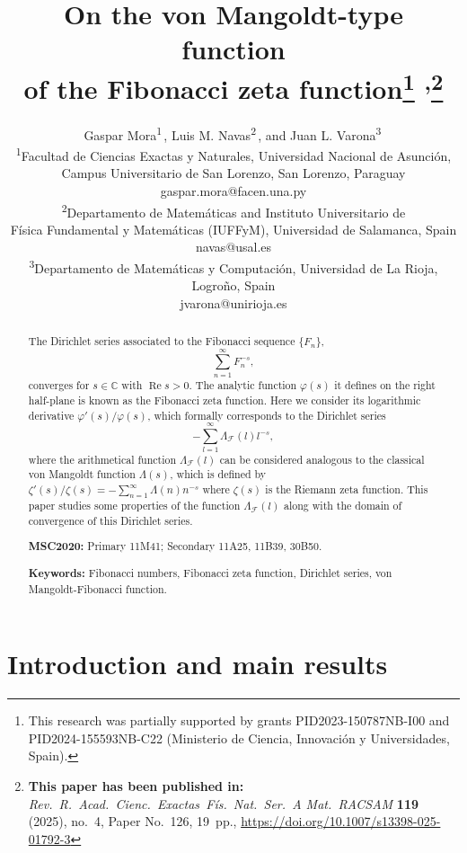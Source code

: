 \documentclass[11pt, a4paper]{article}
\title{On the von Mangoldt-type function\\of the Fibonacci zeta function\thanks{%
This research was partially supported by grants PID2023-150787NB-I00 and PID2024-155593NB-C22
(Minis\-te\-rio de Cien\-cia, Inno\-va\-ci\'on y Uni\-ver\-si\-da\-des, Spain).}
\textsuperscript{,}\thanks{\textbf{This paper has been published in:} \textit{Rev.\ R.\ Acad.\ Cienc.\ Exactas\ F\'is.\ Nat.\ Ser.\ A Mat.\ RACSAM} \textbf{119} (2025), no.~4, Paper No.~126, 19~pp., \url{https://doi.org/10.1007/s13398-025-01792-3}}}
\author{Gaspar Mora\textsuperscript{1}\,\orcidlink{0000-0003-0883-220X}, 
Luis M. Navas\textsuperscript{2}\,\orcidlink{0000-0002-5742-8679}, 
and Juan L. Varona\textsuperscript{3}\,\orcidlink{0000-0002-2023-9946}\\[6pt]
  \small 
  \textsuperscript{1}Facultad de Ciencias Exactas y Naturales, Universidad Nacional de Asunci\'on,\\[-2pt]
  \small Campus Universitario de San Lorenzo, San Lorenzo, Paraguay\\[-1pt]
  \small {gaspar.mora@facen.una.py}\\[3pt]
  \small 
  \textsuperscript{2}Departamento de Matem\'aticas and 
  Instituto Universitario de \\[-2pt]
  \small F\'isica Fundamental y Matem\'aticas (IUFFyM), Universidad de Salamanca, Spain\\[-1pt]
  \small {navas@usal.es}\\[3pt]
  \small 
  \textsuperscript{3}Departamento de Matem\'aticas y
  Computaci\'on, Universidad de La Rioja,\\[-2pt]
  \small Logro\~no, Spain\\[-1pt]
  \small {jvarona@unirioja.es}
}
\date{}     %
\newcommand{\C}{\mathbb{C}}
\renewcommand{\Re}{\operatorname{Re}}
\theoremstyle{plain}
\theoremstyle{definition}
\begin{document}

\maketitle

\begin{abstract}
The Dirichlet series associated to the Fibonacci sequence $\{F_{n}\}$, 
\begin{equation*}
  \sum_{n=1}^{\infty} F_{n}^{-s},
\end{equation*}
converges for $s\in \mathbb{C}$ with $\Re s > 0$. The analytic function $\varphi(s)$ it defines on the right half-plane is known as the Fibonacci zeta function. Here we consider its logarithmic derivative $\varphi'(s)/\varphi(s)$, which formally corresponds to the Dirichlet series 
\begin{equation*}
  -\sum_{l=1}^{\infty} \Lambda_{\mathcal{F}}(l)l^{-s},
\end{equation*}
where the arithmetical function $\Lambda_{\mathcal{F}}(l)$ can be considered analogous to the classical von Mangoldt function $\Lambda(s)$, which is defined by $\zeta'(s)/\zeta(s) = -\sum_{n=1}^{\infty} \Lambda(n) n^{-s}$ where $\zeta(s)$ is the Riemann zeta function. This paper studies some properties of the function $\Lambda_{\mathcal{F}}(l)$ along with the domain of convergence of this Dirichlet series.

\medskip

\textbf{MSC2020:} Primary 11M41; Secondary 11A25, 11B39, 30B50.

\smallskip

\textbf{Keywords:} Fibonacci numbers, Fibonacci zeta function, Dirichlet series, von Mangoldt-Fibonacci function.
\end{abstract}

\section{Introduction and main results}
\end{document}
